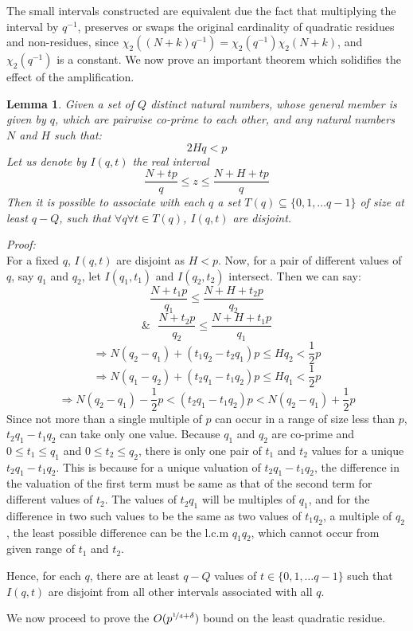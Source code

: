 \documentclass{report}
\newtheorem{lemma}{Lemma}
\begin{document}
The small intervals constructed are equivalent due the fact that multiplying the interval by $q^{-1}$, preserves or swaps the original cardinality of quadratic residues and non-residues, since $\chi_2((N+k)q^{-1})=\chi_2(q^{-1})\chi_2(N+k)$, and $\chi_2(q^{-1})$ is a constant. We now prove an important theorem which solidifies the effect of the amplification.
%
\begin{lemma}
Given a set of $Q$ distinct natural numbers, whose general member is given by $q$, which are pairwise co-prime to each other, and any natural numbers $N$ and $H$ such that:
\begin{equation} \label{lemma3cond}
2Hq<p
\end{equation}
Let us denote by $I(q,t)$ the real interval
$$\frac{N+tp}{q} \leq z \leq \frac{N+H+tp}{q}$$
Then it is possible to associate with each $q$ a set $T(q)\subseteq \{0,1,\ldots q-1\}$ of size at least $q-Q$, such that $\forall q \forall t\in T(q)$, $I(q,t)$ are disjoint.
\end{lemma}
\textit{Proof:}\\
For a fixed $q$, $I(q,t)$ are disjoint as $H<p$. Now, for a pair of different values of $q$, say $q_1$ and $q_2$, let $I(q_1,t_1)$ and $I(q_2,t_2)$ intersect. Then we can say:
$$\frac{N+t_1p}{q_1} \leq \frac{N+H+t_2p}{q_2}$$
$$\&\text{ }\frac{N+t_2p}{q_2} \leq \frac{N+H+t_1p}{q_1}$$
$$\Rightarrow N(q_2-q_1)+(t_1q_2-t_2q_1)p\leq Hq_2<\frac{1}{2}p$$
$$\Rightarrow N(q_1-q_2)+(t_2q_1-t_1q_2)p\leq Hq_1<\frac{1}{2}p$$
$$\Rightarrow N(q_2-q_1)-\frac{1}{2}p < (t_2q_1-t_1q_2)p <N(q_2-q_1)+\frac{1}{2}p$$
Since not more than a single multiple of $p$ can occur in a range of size less than $p$, $t_2q_1-t_1q_2$ can take only one value. Because $q_1$ and $q_2$ are co-prime and $0\leq t_1 \leq q_1$ and $0\leq t_2 \leq q_2$, there is only one pair of $t_1$ and $t_2$ values for a unique $t_2q_1-t_1q_2$. This is because for a unique valuation of $t_2q_1-t_1q_2$, the difference in the valuation of the first term must be same as that of the second term for different values of $t_2$. The values of $t_2q_1$ will be multiples of $q_1$, and for the difference in two such values to be the same as two values of $t_1q_2$, a multiple of $q_2$, the least possible difference can be the l.c.m $q_1q_2$, which cannot occur from given range of $t_1$ and $t_2$.

Hence, for each $q$, there are at least $q-Q$ values of $t\in \{0,1,\ldots q-1\}$ such that $I(q,t)$ are disjoint from all other intervals associated with all $q$.

We now proceed to prove the $O(p^{\nicefrac{1}{4}+\delta})$ bound on the least quadratic residue.
%
%
\end{document}
